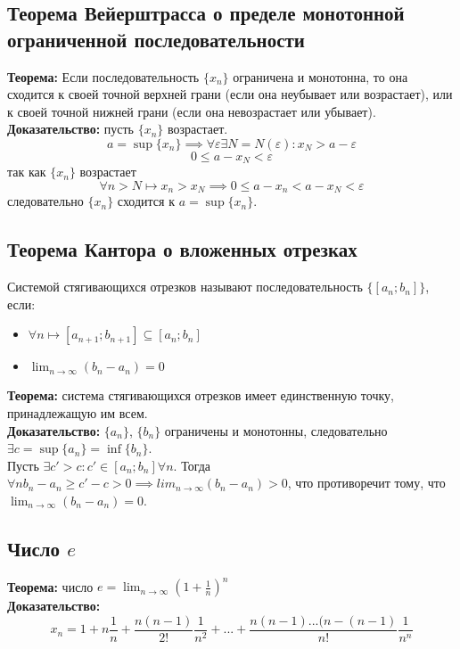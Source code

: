 \documentclass{article}
\begin{document}
    \subsection*{Теорема  Вейерштрасса  о  пределе  монотонной  ограниченной  последовательности}
        \textbf{Теорема:} Если последовательность $\{x_n\}$ ограничена и монотонна, то она сходится к своей точной верхней грани (если она неубывает или возрастает),
        или к своей точной нижней грани (если она невозрастает или убывает).
        \\
        \textbf{Доказательство:}
        пусть $\{x_n\}$ возрастает. 
        \[ a = \sup \{x_n\} \implies \forall \varepsilon \exists N = N(\varepsilon): x_{N} > a - \varepsilon \]
        \[ 0 \le a - x_{N} < \varepsilon \]
        так как $\{x_n\}$ возрастает
        \[ \forall n > N \longmapsto x_n > x_N \implies 0 \le a - x_{n} < a - x_{N} < \varepsilon \]
        следовательно $\{x_n\}$ сходится к $a = \sup \{x_n\}$.
        
        
    \subsection*{Теорема Кантора о вложенных отрезках}
        Системой стягивающихся отрезков называют последовательность $\{[a_n;b_n]\}$, если:
        \begin{itemize}
            \item $\forall n \longmapsto [a_{n+1};b_{n+1}] \subseteq [a_{n};b_{n}]$
            \item $\lim_{n\to\infty} (b_n - a_n) = 0$
        \end{itemize}
        \textbf{Теорема:} система стягивающихся отрезков имеет единственную точку, принадлежащую им всем.
        \\
        \textbf{Доказательство:}
        $\{a_n\}$, $\{b_n\}$ ограничены и монотонны, следовательно $\exists c = \sup \{a_n\} = \inf \{b_n\}$.
        \\
        Пусть $\exists c' > c: c' \in [a_n; b_n] \forall n$. Тогда $\forall n b_n - a_n \ge c' - c > 0 \implies lim_{n\to\infty} (b_n - a_n) > 0$,
        что противоречит тому, что $\lim_{n\to\infty} (b_n - a_n) = 0$.
        
        
    \subsection*{Число $e$}
        \textbf{Теорема:} число $e = \lim_{n\to\infty} \left(1 + \frac{1}{n} \right)^n$
        \\
        \textbf{Доказательство:}
        \[ x_n = 1 + n\frac{1}{n} + \frac{n(n-1)}{2!}\frac{1}{n^2} + ... +
        \frac{n(n-1)...(n - (n - 1)}{n!}\frac{1}{n^n} \]
        
\end{document}
